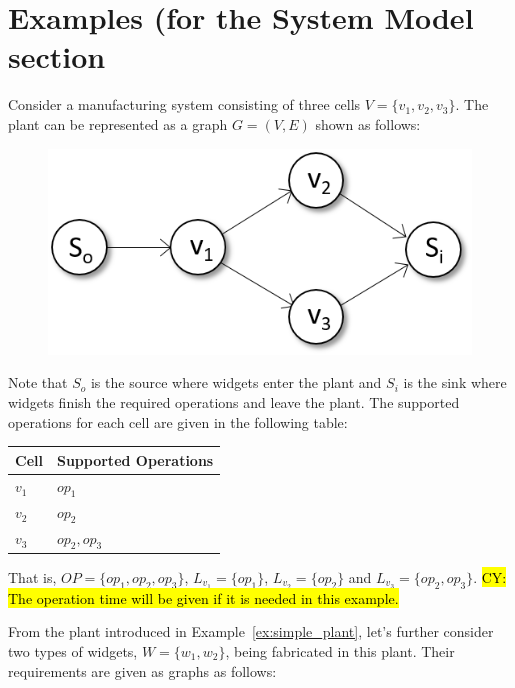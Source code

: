 \section{Examples (for the System Model section}

\begin{example}
\label{ex:first}
Consider a manufacturing system consisting of three cells $V=\{v_1, v_2, v_3\}$.
The plant can be represented as a graph $G=(V,E)$ shown as follows: %

\begin{figure}[h]
\centering
\includegraphics[width=0.5\columnwidth]{Figures/ex_plant_graph}
\label{fig:ex_plant_graph}
\end{figure}

\noindent
Note that $S_o$ is the source where widgets enter the plant and $S_i$ is the sink where widgets finish the required operations and leave the plant. The supported operations for each cell are given in the following table:

\begin{table}[h]
\centering
\begin{tabular}{|l|l|}
\hline
Cell & Supported Operations \\ \hline \hline
$v_1$ & $op_1$         \\ \hline
$v_2$ & $op_2$         \\ \hline
$v_3$ & $op_2, op_3$         \\ \hline
\end{tabular}
\end{table}

That is, $OP=\{op_1, op_2, op_3\}$, $L_{v_1}=\{op_1\}$, $L_{v_2}=\{op_2\}$ and $L_{v_3}=\{op_2, op_3\}$. 
\hl{CY: The operation time will be given if it is needed in this example.}

From the plant introduced in Example~\ref{ex:simple_plant}, let's further consider two types of widgets, $W=\{w_1, w_2\}$, being fabricated in this plant.
Their requirements are given as graphs as follows:


\end{example}
